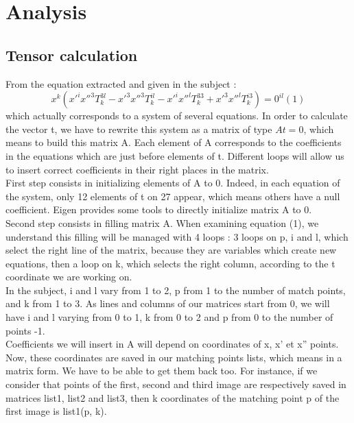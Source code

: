 \documentclass[a4paper,10pt]{report}
\begin{document}
\chapter{Analysis}
\section{Tensor calculation}


From the equation extracted and given in the subject :
\[x^{k}(x'^{i}x''^{3}T^{3l}_{k} - x'^{3}x''^{3}T^{il}_{k} - x'^{i}x''^{l}T^{33}_{k} + x'^{3}x''^{l}T^{i3}_{k}) = 0^{il}  (1)\]
which actually corresponds to a system of several equations. In order to calculate the vector t, we have to rewrite this system as 
a matrix of type \begin{math}At = 0\end{math}, which means to build this matrix A. Each element of A corresponds to the coefficients in the equations 
which are just before elements of t. Different loops will allow us to insert correct coefficients in their right places in the matrix.
\\

First step consists in initializing elements of A to 0. Indeed, in each equation of the system, only 12 elements of t on 27 appear, which 
means others have a null coefficient. Eigen provides some tools to directly initialize matrix A to 0.
\\

Second step consists in filling matrix A. When examining equation (1), we understand this filling will be managed with 4 loops : 3 loops 
on p, i and l, which select the right line of the matrix, because they are variables which create new equations, then a loop on k, which
 selects the right column, according to the t coordinate we are working on.
\\

In the subject, i and l vary from 1 to 2, p from 1 to the number of match points, and k from 1 to 3. As lines and columns of our 
matrices start from 0, we will have i and l varying from 0 to 1, k from 0 to 2 and p from 0 to the number of points -1.
\\

Coefficients we will insert in A will depend on coordinates of x, x’ et x” points. Now, these coordinates are saved in our matching points
 lists, which means in a matrix form. We have to be able to get them back too. For instance, if we consider that points of the first, 
second and third image are respectively saved in matrices list1, list2 and list3, then k coordinates of the matching point p of the 
first image is list1(p, k).
\\
\end{document}
